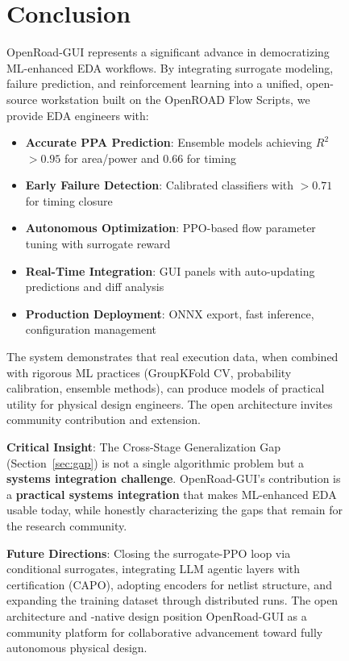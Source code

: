 \documentclass[10pt,conference]{IEEEtran}
\newcommand{\Rtwo}{$R^2$}
\newcommand{\ORFS}{\text{ORFS}}
\newcommand{\GNN}{\text{GNN}}
\newcommand{\AUC}{\text{AUC}}
\begin{document}
\begin{figure}[t]

\section{Conclusion}
\label{sec:conclusion}

OpenRoad-GUI represents a significant advance in democratizing ML-enhanced EDA workflows. By integrating surrogate modeling, failure prediction, and reinforcement learning into a unified, open-source workstation built on the OpenROAD Flow Scripts, we provide EDA engineers with:

\begin{itemize}
    \item \textbf{Accurate PPA Prediction}: Ensemble models achieving \Rtwo{} $> 0.95$ for area/power and 0.66 for timing
    \item \textbf{Early Failure Detection}: Calibrated classifiers with \AUC{} $> 0.71$ for timing closure
    \item \textbf{Autonomous Optimization}: PPO-based flow parameter tuning with surrogate reward
    \item \textbf{Real-Time Integration}: GUI panels with auto-updating predictions and diff analysis
    \item \textbf{Production Deployment}: ONNX export, fast inference, configuration management
\end{itemize}

The system demonstrates that real \ORFS{} execution data, when combined with rigorous ML practices (GroupKFold CV, probability calibration, ensemble methods), can produce models of practical utility for physical design engineers. The open architecture invites community contribution and extension.

\textbf{Critical Insight}: The Cross-Stage Generalization Gap (Section~\ref{sec:gap}) is not a single algorithmic problem but a \textbf{systems integration challenge}. OpenRoad-GUI's contribution is a \textbf{practical systems integration} that makes ML-enhanced EDA usable today, while honestly characterizing the gaps that remain for the research community.

\textbf{Future Directions}: Closing the surrogate-PPO loop via conditional surrogates, integrating LLM agentic layers with certification (CAPO), adopting \GNN{} encoders for netlist structure, and expanding the training dataset through distributed \ORFS{} runs. The open architecture and \ORFS{}-native design position OpenRoad-GUI as a community platform for collaborative advancement toward fully autonomous physical design.


\end{figure}
\end{document}
